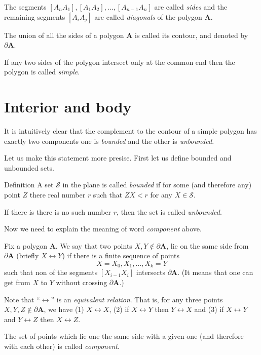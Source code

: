 {The segments $[A_nA_1],[A_1A_2],\dots,[A_{n-1} A_n]$
are called \emph{sides} and the remaining segments $[A_iA_j]$ are called \emph{diagonals} of the polygon $\bm{A}$.

The union of all the sides of a polygon $\bm{A}$ is called its contour,
and denoted by $\partial \bm{A}$.

If any two sides of the polygon 
intersect only at the common end 
then the polygon is called  \emph{simple}.

\section*{Interior and body}

It is intuitively clear that 
the complement to the contour of a simple polygon
has exactly two components 
one is \emph{bounded} 
and the other is \emph{unbounded}. 

Let us make this statement more presise.
First let us define bounded and unbounded sets.

\begin{thm}{Definition}
A set $\mathcal{S}$ in the plane 
is called \emph{bounded} 
if for some (and therefore any) point $Z$ 
there real number $r$ such that $ZX<r$ for any $X\in \mathcal{S}$.

If there is there is no such number $r$, 
then the set is called \emph{unbounded}.
\end{thm}

Now we need to explain the meaning of word \emph{component} above. 

Fix a polygon $\bm{A}$.
We say that two points $X,Y\notin \partial \bm{A}$,
lie
on the same side from $\partial\bm{A}$ (briefly $X\leftrightarrow Y$)
if there is a finite sequence of points
\[X=X_0, X_1,\dots, X_k=Y\]
such that non of the segments $[X_{i-1}X_i]$ intersects $\partial\bm{A}$.
(It means that one can get from $X$ to $Y$ without crossing $\partial\bm{A}$.)

Note that ``$\leftrightarrow$'' is an \emph{equivalent relation}.
That is, 
for any three points $X,Y,Z\notin\partial \bm{A}$,
we have 
(1) $X\leftrightarrow X$,
(2) if $X\leftrightarrow Y$
then  $Y\leftrightarrow X$
and 
(3) if $X\leftrightarrow Y$ 
and $Y\leftrightarrow Z$ 
then  $X\leftrightarrow Z$.

The set of points which lie one the same side with a given one (and therefore with each other) is called \emph{component}.

}
